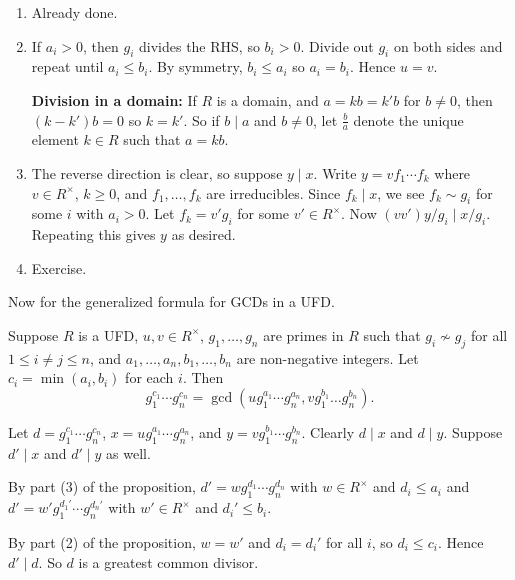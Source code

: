 \documentclass[12pt,letterpaper]{report}
\begin{document}
\begin{thmproof}
  \begin{enumerate}
    \item Already done.
    \item If $a_i > 0$, then $g_i$ divides the RHS, so $b_i > 0$.
      Divide out $g_i$ on both sides and repeat until $a_i \leq b_i$.
      By symmetry, $b_i \leq a_i$ so $a_i = b_i$.
      Hence $u = v$.

      \begin{tcolorbox}
        \textbf{Division in a domain:} If $R$ is a domain, and $a = kb = k'b$ for $b \neq 0$, then
        $(k - k')b = 0$ so $k = k'$.
        So if $b \mid a$ and $b \neq 0$, let $\frac{b}{a}$ denote the unique element $k \in R$
        such that $a = kb$.
      \end{tcolorbox}
    \item The reverse direction is clear, so suppose $y \mid x$.
      Write $y = vf_1 \cdots f_k$ where $v \in R^\times$, $k \geq 0$, and $f_1, \ldots, f_k$ are
      irreducibles.
      Since $f_k \mid x$, we see $f_k \sim g_i$ for some $i$ with $a_i > 0$.
      Let $f_k = v'g_i$ for some $v' \in R^\times$.
      Now $(vv')y/g_i \mid x/g_i$.
      Repeating this gives $y$ as desired.
    \item Exercise.
  \end{enumerate}
\end{thmproof}

Now for the generalized formula for GCDs in a UFD.

\begin{prop}{}{}
  Suppose $R$ is a UFD, $u, v \in R^\times$, $g_1, \ldots, g_n$ are primes in $R$ such that
  $g_i \not\sim g_j$ for all $1 \leq i \neq j \leq n$, and $a_1, \ldots, a_n, b_1, \ldots, b_n$ are
  non-negative integers.
  Let $c_i = \min(a_i, b_i)$ for each $i$.
  Then
  \[ g_1^{c_1} \cdots g_n^{c_n} = \gcd(ug_1^{a_1} \cdots g_n^{a_n}, vg_1^{b_1} \ldots g_n^{b_n}). \]
\end{prop}

\begin{thmproof}
  Let $d = g_1^{c_1} \cdots g_n^{c_n}$, $x = ug_1^{a_1} \cdots g_n^{a_n}$, and
  $y = vg_1^{b_1} \cdots g_n^{b_n}$.
  Clearly $d \mid x$ and $d \mid y$.
  Suppose $d' \mid x$ and $d' \mid y$ as well.

  By part (3) of the proposition, $d' = wg_1^{d_1} \cdots g_n^{d_n}$ with $w \in R^\times$ and
  $d_i \leq a_i$ and $d' = w'g_1^{d_1'} \cdots g_n^{d_n'}$ with $w' \in R^\times$ and
  $d_i' \leq b_i$.

  By part (2) of the proposition, $w = w'$ and $d_i = d_i'$ for all $i$, so $d_i \leq c_i$.
  Hence $d' \mid d$.
  So $d$ is a greatest common divisor.
\end{thmproof}
\end{document}

